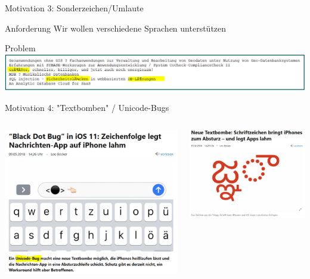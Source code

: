 \documentclass[xelatex,aspectratio=169]{beamer}
\begin{document}
\begin{frame}{Motivation 3: Sonderzeichen/Umlaute}
    \begin{block}{Anforderung}
        Wir wollen verschiedene Sprachen unterstützen
    \end{block}
    \begin{alertblock}{Problem}
        \includegraphics[width=\textwidth]{img/codierung_unicode_fail.png}
    \end{alertblock}
\end{frame}

\begin{frame}{Motivation 4: "Textbomben" / Unicode-Bugs}
    \begin{columns}
        \begin{column}{0.5\textwidth}
            \includegraphics[width=\textwidth]{img/codierung_unicode_bomb_1.png}
        \end{column}
        \begin{column}{0.5\textwidth}
            \includegraphics[width=\textwidth]{img/codierung_unicode_bomb_2.png}

\end{column}
\end{columns}
\end{frame}
\end{document}
